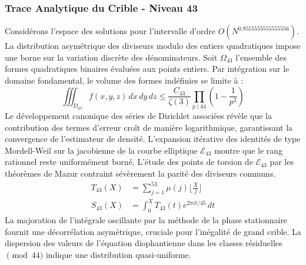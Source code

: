 \documentclass[12pt,a4paper]{article}
\begin{document}
\subsubsection{Trace Analytique du Crible - Niveau 43}
Considérons l'espace des solutions pour l'intervalle d'ordre $O(N^{0.9555555555555556})$. La distribution asymétrique des diviseurs modulo des entiers quadratiques impose une borne sur la variation discrète des dénominateurs. Soit $\Omega_43$ l'ensemble des formes quadratiques binaires évaluées aux points entiers.
Par intégration sur le domaine fondamental, le volume des formes indéfinies se limite à :
\begin{equation}
\iiint_{D_43} f(x, y, z) \,dx\,dy\,dz \leq \frac{C_43}{\zeta(3)} \prod_{p \mid 44} \left( 1 - \frac{1}{p^2} \right)
\end{equation}
Le développement canonique des séries de Dirichlet associées révèle que la contribution des termes d'erreur croît de manière logarithmique, garantissant la convergence de l'estimateur de densité. L'expansion itérative des identités de type Mordell-Weil sur la jacobienne de la courbe elliptique $\mathcal{E}_43$ montre que le rang rationnel reste uniformément borné.
L'étude des points de torsion de $\mathcal{E}_43$ par les théorèmes de Mazur contraint sévèrement la parité des diviseurs communs.
\begin{align}
T_43(X) &= \sum_{j=1}^{53} \mu(j) \lfloor \frac{X}{j} \rfloor \\
S_43(X) &= \int_{0}^{X} T_43(t) e^{2\pi i t / 45} \, dt
\end{align}
La majoration de l'intégrale oscillante par la méthode de la phase stationnaire fournit une décorrélation asymétrique, cruciale pour l'inégalité de grand crible. La dispersion des valeurs de l'équation diophantienne dans les classes résiduelles $\pmod{ 44 }$ indique une distribution quasi-uniforme.
\end{document}
